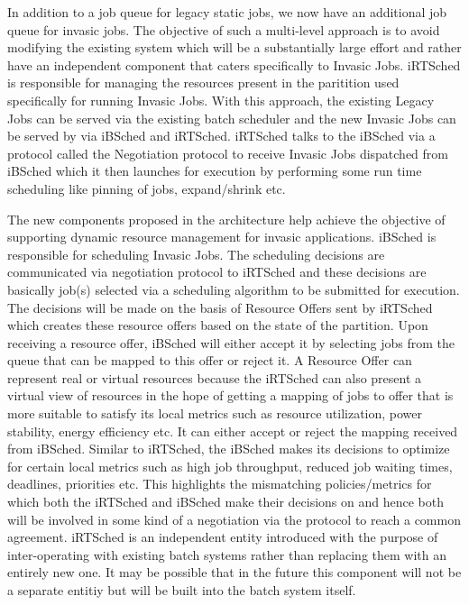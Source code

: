 In addition to a job queue for legacy static jobs, we now have an additional job queue for invasic jobs. The objective of such a multi-level approach is to avoid modifying the existing system which will be a substantially large effort and rather have an independent component that caters specifically to Invasic Jobs. iRTSched is responsible for managing the resources present in the paritition used specifically for running Invasic Jobs. With this approach, the existing Legacy Jobs can be served via the existing batch scheduler and the new Invasic Jobs can be served by via iBSched and iRTSched. iRTSched talks to the iBSched via a protocol called the Negotiation protocol to receive Invasic Jobs dispatched from iBSched which it then launches for execution by performing some run time scheduling like pinning of jobs, expand/shrink etc.\\ \par
\noindent
The new components proposed in the architecture help achieve the objective of supporting dynamic resource management for invasic applications. iBSched is responsible for scheduling Invasic Jobs. The scheduling decisions are communicated via negotiation protocol to iRTSched and these decisions are basically job(s) selected via a scheduling algorithm to be submitted for execution. The decisions will be made on the basis of Resource Offers sent by iRTSched which creates these resource offers based on the state of the partition. Upon receiving a resource offer, iBSched will either accept it by selecting jobs from the queue that can be mapped to this offer or reject it. A Resource Offer can represent real or virtual resources because the iRTSched can also present a virtual view of resources in the hope of getting a mapping of jobs to offer that is more suitable to satisfy its local metrics such as resource utilization, power stability, energy efficiency etc. It can either accept or reject the mapping received from iBSched. Similar to iRTSched, the iBSched makes its decisions to optimize for certain local metrics such as high job throughput, reduced job waiting times, deadlines, priorities etc. This highlights the mismatching policies/metrics for which both the iRTSched and iBSched make their decisions on and hence both will be involved in some kind of a negotiation via the protocol to reach a common agreement. iRTSched is an independent entity introduced with the purpose of inter-operating with existing batch systems rather than replacing them with an entirely new one. It may be possible that in the future this component will not be a separate entitiy but will be built into the batch system itself.
